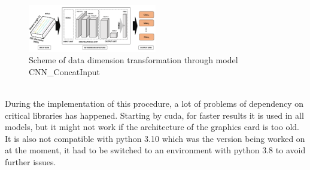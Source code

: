 \leavevmode\\
\begin{figure}[h!]
  \caption{Scheme of data dimension transformation through model CNN\_ConcatInput}
  \centering
  \includegraphics[width=0.5\textwidth]{img/FeatureProjectorModel CHM.png}
\end{figure}
\leavevmode\\
During the implementation of this procedure, a lot of problems of dependency on critical libraries has happened. Starting by cuda, for faster results it is used in all models, but it might not work if the architecture of the graphics card is too old. It is also not compatible with python 3.10 which was the version being worked on at the moment, it had to be switched to an environment with python 3.8 to avoid further issues.
\\

